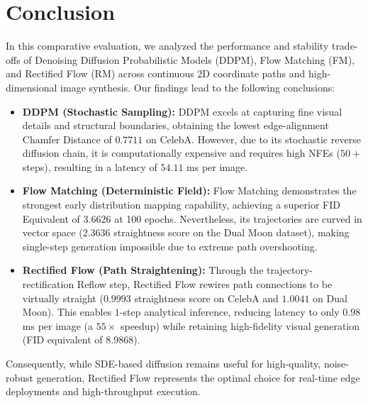 \documentclass[11pt,a4paper]{article}
\begin{document}
\section{Conclusion}
In this comparative evaluation, we analyzed the performance and stability trade-offs of Denoising Diffusion Probabilistic Models (DDPM), Flow Matching (FM), and Rectified Flow (RM) across continuous 2D coordinate paths and high-dimensional image synthesis. Our findings lead to the following conclusions:
\begin{itemize}
    \item \textbf{DDPM (Stochastic Sampling):} DDPM excels at capturing fine visual details and structural boundaries, obtaining the lowest edge-alignment Chamfer Distance of $0.7711$ on CelebA. However, due to its stochastic reverse diffusion chain, it is computationally expensive and requires high NFEs ($50+$ steps), resulting in a latency of $54.11$ ms per image.
    \item \textbf{Flow Matching (Deterministic Field):} Flow Matching demonstrates the strongest early distribution mapping capability, achieving a superior FID Equivalent of $3.6626$ at 100 epochs. Nevertheless, its trajectories are curved in vector space ($2.3636$ straightness score on the Dual Moon dataset), making single-step generation impossible due to extreme path overshooting.
    \item \textbf{Rectified Flow (Path Straightening):} Through the trajectory-rectification Reflow step, Rectified Flow rewires path connections to be virtually straight ($0.9993$ straightness score on CelebA and $1.0041$ on Dual Moon). This enables $1$-step analytical inference, reducing latency to only $0.98$ ms per image (a $55\times$ speedup) while retaining high-fidelity visual generation (FID equivalent of $8.9868$).
\end{itemize}
Consequently, while SDE-based diffusion remains useful for high-quality, noise-robust generation, Rectified Flow represents the optimal choice for real-time edge deployments and high-throughput execution.
\end{document}
